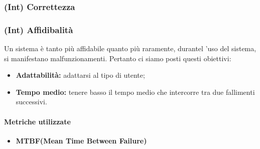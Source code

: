 \subsubsection{(Int) Correttezza}
\subsubsection{(Int) Affidibalità}
	Un sistema è tanto più affidabile quanto più raramente, durantel 'uso del sistema, si manifestano malfunzionamenti. Pertanto ci siamo posti questi obiettivi:
	\begin{itemize}
	\item \textbf{Adattabilità:} adattarsi al tipo di utente;
	\item \textbf{Tempo medio:} tenere basso il tempo medio che intercorre tra due fallimenti successivi.
\end{itemize}
\paragraph{Metriche utilizzate}
\begin{itemize}
	\item \textbf{MTBF(Mean Time Between Failure)}
\end{itemize}
\begin{table}[!htpb]
\end{table}
